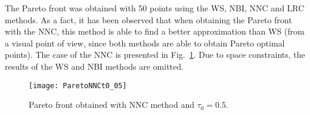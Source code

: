 The Pareto front was obtained with 50 points using the WS, NBI, NNC and LRC methods. 
%
%
%
%
As a fact, it has been observed that when obtaining the Pareto front with the NNC, this method is able to find a better approximation than WS (from a visual point of view, since both methods are able to obtain Pareto optimal points). The case of the NNC is presented in Fig.~\ref{fig:ParetoNNCt0_05}. Due to space constraints, the results of the WS and NBI methods are omitted. 

\begin{figure}%
	\centering
	\texttt{[image: ParetoNNCt0\_05]}%
	\caption{Pareto front obtained with NNC method and $\tau_0=0.5$.}%
	\label{fig:ParetoNNCt0_05}%
\end{figure}
%

